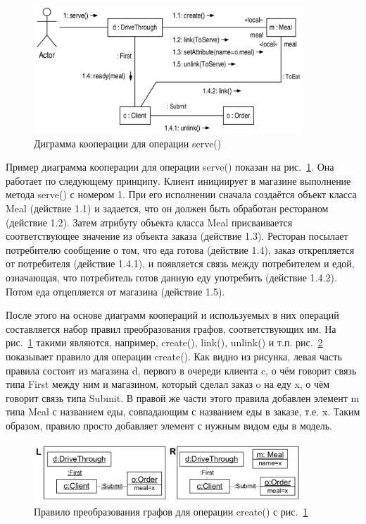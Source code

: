 \documentclass[a5paper]{article}
\begin{document}
\begin{figure} [ht]
  \begin{center}
    \includegraphics[width=0.9\textwidth]{3b.png}
    \caption{Диграмма кооперации для операции serve()}
    \label{fig3b}
  \end{center}
\end{figure}

Пример диаграмма кооперации для операции serve() показан на рис.~\ref{fig3b}. Она работает по следующему принципу. Клиент инициирует в магазине выполнение метода serve() с номером 1. При его исполнении сначала создаётся объект класса Meal (действие 1.1) и задается, что он должен быть обработан рестораном (действие 1.2). Затем атрибуту объекта класса Meal присваивается соответствующее значение из объекта заказа (действие 1.3). Ресторан посылает потребителю сообщение о том, что еда готова (действие 1.4), заказ открепляется от потребителя (действие 1.4.1), и появляется связь между потребителем и едой, означающая, что потребитель готов данную еду употребить (действие 1.4.2). Потом еда отцепляется от магазина (действие 1.5).

После этого на основе диаграмм коопераций и используемых в них операций составляется набор правил преобразования графов, соответствующих им. На рис.~\ref{fig3b} такими являются, например, create(), link(), unlink() и т.п. рис.~\ref{fig4} показывает правило для операции create(). Как видно из рисунка, левая часть правила состоит из магазина d, первого в очереди клиента c, о чём говорит связь типа First между ним и магазином, который сделал заказ o на еду x, о чём говорит связь типа Submit. В правой же части этого правила добавлен элемент m типа Meal с названием еды, совпадающим с названием еды в заказе, т.е. x. Таким образом, правило просто добавляет элемент с нужным видом еды в модель.

\begin{figure} [ht]
  \begin{center}
    \includegraphics[width=0.9\textwidth]{4.png}
    \caption{Правило преобразования графов для операции create() с рис.~\ref{fig3b}}
    \label{fig4}
  \end{center}
\end{figure}
\end{document}
